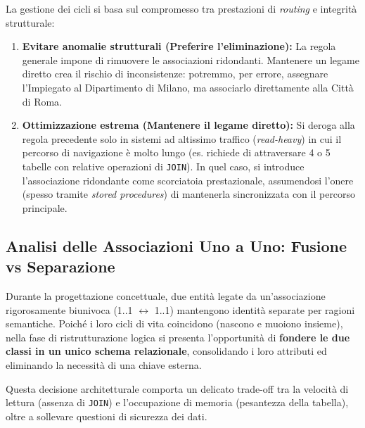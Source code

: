 \begin{tip}
La gestione dei cicli si basa sul compromesso tra prestazioni di \textit{routing} e integrità strutturale:
\begin{enumerate}
    \item \textbf{Evitare anomalie strutturali (Preferire l'eliminazione):} La regola generale impone di rimuovere le associazioni ridondanti. Mantenere un legame diretto crea il rischio di inconsistenze: potremmo, per errore, assegnare l'Impiegato al Dipartimento di Milano, ma associarlo direttamente alla Città di Roma. 
    \item \textbf{Ottimizzazione estrema (Mantenere il legame diretto):} Si deroga alla regola precedente solo in sistemi ad altissimo traffico (\textit{read-heavy}) in cui il percorso di navigazione è molto lungo (es. richiede di attraversare 4 o 5 tabelle con relative operazioni di \texttt{JOIN}). In quel caso, si introduce l'associazione ridondante come scorciatoia prestazionale, assumendosi l'onere (spesso tramite \textit{stored procedures}) di mantenerla sincronizzata con il percorso principale.
\end{enumerate}
\end{tip}

\subsection{Analisi delle Associazioni Uno a Uno: Fusione vs Separazione}

Durante la progettazione concettuale, due entità legate da un'associazione rigorosamente biunivoca (1..1 $\leftrightarrow$ 1..1) mantengono identità separate per ragioni semantiche. Poiché i loro cicli di vita coincidono (nascono e muoiono insieme), nella fase di ristrutturazione logica si presenta l'opportunità di \textbf{fondere le due classi in un unico schema relazionale}, consolidando i loro attributi ed eliminando la necessità di una chiave esterna.

Questa decisione architetturale comporta un delicato trade-off tra la velocità di lettura (assenza di \texttt{JOIN}) e l'occupazione di memoria (pesantezza della tabella), oltre a sollevare questioni di sicurezza dei dati.

